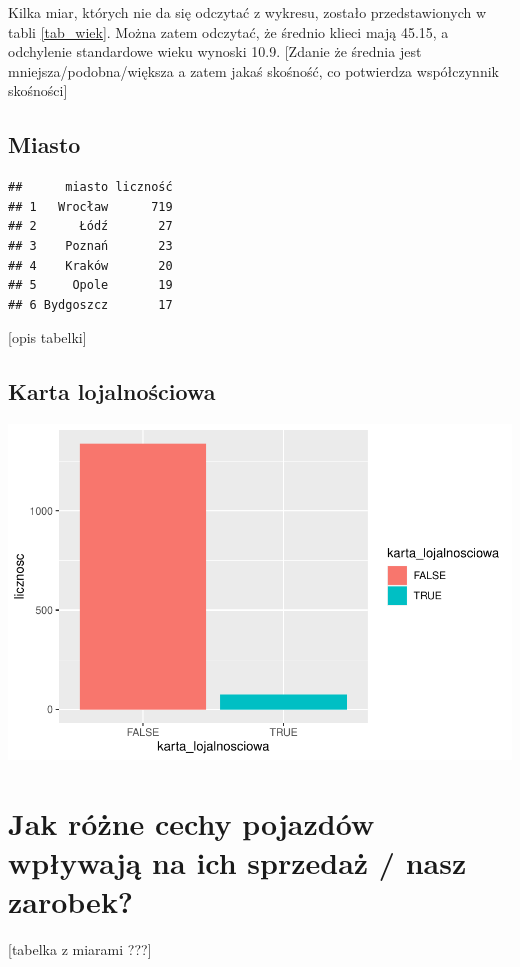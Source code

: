 \documentclass{article}\usepackage[]{graphicx}\usepackage[]{xcolor}
\makeatletter
\def\maxwidth{ %
  \ifdim\Gin@nat@width>\linewidth
    \linewidth
  \else
    \Gin@nat@width
  \fi
}
\newenvironment{kframe}{%
 \def\at@end@of@kframe{}%
 \ifinner\ifhmode%
  \def\at@end@of@kframe{\end{minipage}}%
  \begin{minipage}{\columnwidth}%
 \fi\fi%
 \def\FrameCommand##1{\hskip\@totalleftmargin \hskip-\fboxsep
 \colorbox{shadecolor}{##1}\hskip-\fboxsep
     \hskip-\linewidth \hskip-\@totalleftmargin \hskip\columnwidth}%
 \MakeFramed {\advance\hsize-\width
   \@totalleftmargin\z@ \linewidth\hsize
   \@setminipage}}%
 {\par\unskip\endMakeFramed%
 \at@end@of@kframe}
\newenvironment{knitrout}{}{} %
\makeatother
\begin{document}
Kilka miar, których nie da się odczytać z wykresu, zostało przedstawionych w tabli \ref{tab_wiek}. Można zatem odczytać, że średnio klieci mają 45.15, a odchylenie standardowe wieku wynoski 10.9. {\color{red}[Zdanie że średnia jest mniejsza/podobna/większa a zatem jakaś skośność, co potwierdza współczynnik skośności]}

\subsection{Miasto}
\begin{knitrout}
\color{fgcolor}\begin{kframe}
\begin{verbatim}
##      miasto liczność
## 1   Wrocław      719
## 2      Łódź       27
## 3    Poznań       23
## 4    Kraków       20
## 5     Opole       19
## 6 Bydgoszcz       17
\end{verbatim}
\end{kframe}
\end{knitrout}

[opis tabelki]

\subsection{Karta lojalnościowa}
\begin{knitrout}
\color{fgcolor}
\includegraphics[width=\maxwidth]{figure/unnamed-chunk-5-1} 
\end{knitrout}

\section{Jak różne cechy pojazdów wpływają na ich sprzedaż / nasz zarobek?}

[tabelka z miarami ???]
\end{document}
